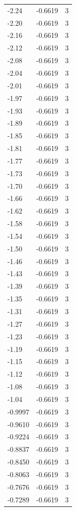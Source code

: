 \begin{longtable}{lrr}
  -2.24 & -0.6619 & 3 \\
  -2.20 & -0.6619 & 3 \\
  -2.16 & -0.6619 & 3 \\
  -2.12 & -0.6619 & 3 \\
  -2.08 & -0.6619 & 3 \\
  -2.04 & -0.6619 & 3 \\
  -2.01 & -0.6619 & 3 \\
  -1.97 & -0.6619 & 3 \\
  -1.93 & -0.6619 & 3 \\
  -1.89 & -0.6619 & 3 \\
  -1.85 & -0.6619 & 3 \\
  -1.81 & -0.6619 & 3 \\
  -1.77 & -0.6619 & 3 \\
  -1.73 & -0.6619 & 3 \\
  -1.70 & -0.6619 & 3 \\
  -1.66 & -0.6619 & 3 \\
  -1.62 & -0.6619 & 3 \\
  -1.58 & -0.6619 & 3 \\
  -1.54 & -0.6619 & 3 \\
  -1.50 & -0.6619 & 3 \\
  -1.46 & -0.6619 & 3 \\
  -1.43 & -0.6619 & 3 \\
  -1.39 & -0.6619 & 3 \\
  -1.35 & -0.6619 & 3 \\
  -1.31 & -0.6619 & 3 \\
  -1.27 & -0.6619 & 3 \\
  -1.23 & -0.6619 & 3 \\
  -1.19 & -0.6619 & 3 \\
  -1.15 & -0.6619 & 3 \\
  -1.12 & -0.6619 & 3 \\
  -1.08 & -0.6619 & 3 \\
  -1.04 & -0.6619 & 3 \\
  -0.9997 & -0.6619 & 3 \\
  -0.9610 & -0.6619 & 3 \\
  -0.9224 & -0.6619 & 3 \\
  -0.8837 & -0.6619 & 3 \\
  -0.8450 & -0.6619 & 3 \\
  -0.8063 & -0.6619 & 3 \\
  -0.7676 & -0.6619 & 3 \\
  -0.7289 & -0.6619 & 3 \\

\end{longtable}
